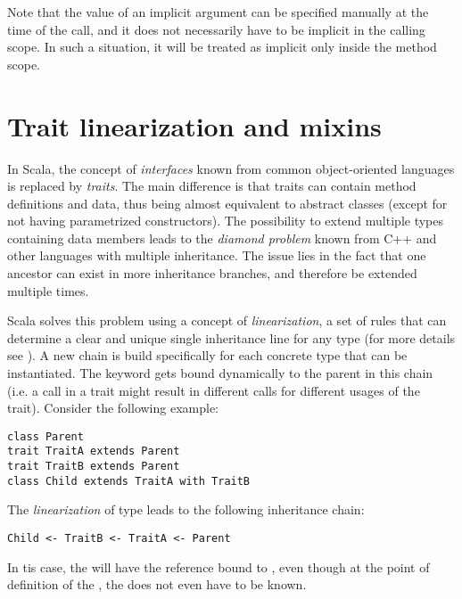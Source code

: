 Note that the value of an implicit argument can be specified manually at the time of the call, and it does not necessarily have to be implicit in the calling scope. In such a situation, it will be treated as implicit only inside the method scope.

\section{Trait linearization and mixins}
\label{sec:linearization_mixins}

In Scala, the concept of \textit{interfaces} known from common object-oriented languages is replaced by \textit{traits}. The main difference is that traits can contain method definitions and data, thus being almost equivalent to abstract classes (except for not having parametrized constructors). The possibility to extend multiple types containing data members leads to the \textit{diamond problem} known from C++ and other languages with multiple inheritance. The issue lies in the fact that one ancestor can exist in more inheritance branches, and therefore be extended multiple times.

Scala solves this problem using a concept of \textit{linearization}, a set of rules that can determine a clear and unique single inheritance line for any type (for more details see \cite{noauthor_trait_2016}). A new chain is build specifically for each concrete type that can be instantiated. The  keyword gets bound dynamically to the parent in this chain (i.e. a  call in a trait might result in different calls for different usages of the trait). Consider the following example:

\lstset{style=Scala}
\begin{lstlisting}
class Parent
trait TraitA extends Parent
trait TraitB extends Parent
class Child extends TraitA with TraitB
\end{lstlisting}

The \textit{linearization} of type  leads to the following inheritance chain:

\lstset{style=Dump}
\begin{lstlisting}
Child <- TraitB <- TraitA <- Parent
\end{lstlisting}

In tis case, the  will have the  reference bound to , even though at the point of definition of the , the  does not even have to be known.

